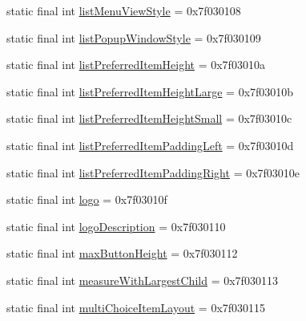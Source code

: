 \begin{DoxyCompactItemize}
\item 
static final int \mbox{\hyperlink{classandroid_1_1support_1_1v7_1_1appcompat_1_1_r_1_1attr_aa3ec9b98b82a1e81834a1937e7de9bc2}{list\+Menu\+View\+Style}} = 0x7f030108
\item 
static final int \mbox{\hyperlink{classandroid_1_1support_1_1v7_1_1appcompat_1_1_r_1_1attr_a2dc07694cb6cde8edf0e8c8036474f6b}{list\+Popup\+Window\+Style}} = 0x7f030109
\item 
static final int \mbox{\hyperlink{classandroid_1_1support_1_1v7_1_1appcompat_1_1_r_1_1attr_a0e2ba60f625823a7581c9eedd3497b86}{list\+Preferred\+Item\+Height}} = 0x7f03010a
\item 
static final int \mbox{\hyperlink{classandroid_1_1support_1_1v7_1_1appcompat_1_1_r_1_1attr_a335034596085454988321b794dfdf279}{list\+Preferred\+Item\+Height\+Large}} = 0x7f03010b
\item 
static final int \mbox{\hyperlink{classandroid_1_1support_1_1v7_1_1appcompat_1_1_r_1_1attr_a12e1c5226243623cef536b891be132f1}{list\+Preferred\+Item\+Height\+Small}} = 0x7f03010c
\item 
static final int \mbox{\hyperlink{classandroid_1_1support_1_1v7_1_1appcompat_1_1_r_1_1attr_a845e0d5d4421edf116e3881087e2a18e}{list\+Preferred\+Item\+Padding\+Left}} = 0x7f03010d
\item 
static final int \mbox{\hyperlink{classandroid_1_1support_1_1v7_1_1appcompat_1_1_r_1_1attr_ad78a5b3a01015c2cccf543dd095a4eb6}{list\+Preferred\+Item\+Padding\+Right}} = 0x7f03010e
\item 
static final int \mbox{\hyperlink{classandroid_1_1support_1_1v7_1_1appcompat_1_1_r_1_1attr_a50c20be0b5db38a3b985474a79edc0de}{logo}} = 0x7f03010f
\item 
static final int \mbox{\hyperlink{classandroid_1_1support_1_1v7_1_1appcompat_1_1_r_1_1attr_a5d3fd08ef454b031b42925c33a6b0333}{logo\+Description}} = 0x7f030110
\item 
static final int \mbox{\hyperlink{classandroid_1_1support_1_1v7_1_1appcompat_1_1_r_1_1attr_a054ee0cbd26c24cb30705753307ccde3}{max\+Button\+Height}} = 0x7f030112
\item 
static final int \mbox{\hyperlink{classandroid_1_1support_1_1v7_1_1appcompat_1_1_r_1_1attr_a421389c4bdd630f16a260d6166745aa8}{measure\+With\+Largest\+Child}} = 0x7f030113
\item 
static final int \mbox{\hyperlink{classandroid_1_1support_1_1v7_1_1appcompat_1_1_r_1_1attr_aff39b926d2e9012794202b8b6f9a0d92}{multi\+Choice\+Item\+Layout}} = 0x7f030115
\item 

\end{DoxyCompactItemize}
